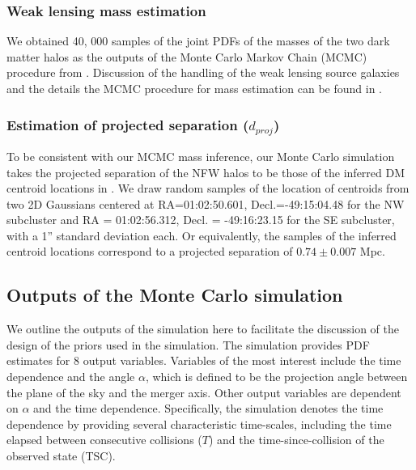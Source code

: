 \subsubsection{Weak lensing mass estimation} 
%
We obtained 40, 000 samples of the joint PDFs of the masses of the two dark
matter halos as the outputs of the Monte Carlo Markov Chain (MCMC)
procedure from \citealt{Jee13}. Discussion of the handling of the weak
lensing source galaxies and the details the MCMC procedure for mass
estimation can be found in \citealt{Jee13}. 


\subsubsection{Estimation of projected separation ($d_{proj}$)} 
To be consistent with our MCMC mass inference, our Monte Carlo simulation takes 
the projected separation of the NFW halos to be those of the inferred
DM centroid locations in \citealt{Jee13}. We draw random samples
 of the location of centroids from two 2D Gaussians centered at
 RA=01:02:50.601, Decl.=-49:15:04.48 for the NW subcluster and RA =
 01:02:56.312, Decl. = -49:16:23.15 for the SE
subcluster, with a 1'' standard deviation each. Or equivalently, the
samples of the inferred centroid locations correspond to a projected separation of
$0.74\pm {0.007}$ Mpc. 

\subsection{Outputs of the Monte Carlo simulation}\label{sec: outputs}
%

We outline the outputs of the simulation here to facilitate the discussion
of the design of the priors used in the simulation. The simulation
provides PDF estimates for 8 output variables. Variables
of the most interest include the time dependence and the angle $\alpha$, which is
defined to be the projection angle between the plane of the sky and the merger axis. Other output variables are dependent on $\alpha$ and the time
dependence. Specifically, the simulation denotes the time dependence by
providing several characteristic time-scales, including the time
elapsed between consecutive collisions
($T$) and the time-since-collision of the observed state (TSC).  

